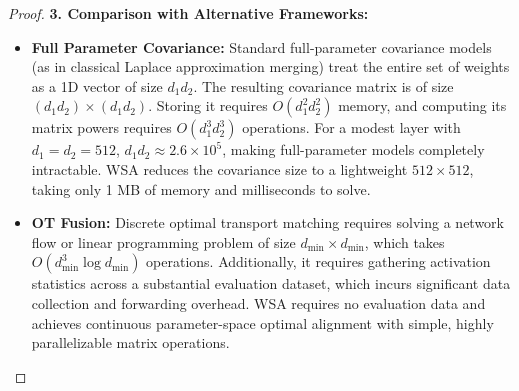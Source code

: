 \documentclass{article}
\theoremstyle{plain}
\theoremstyle{definition}
\theoremstyle{remark}
\begin{document}
\begin{proof}
\textbf{3. Comparison with Alternative Frameworks:}
\begin{itemize}
  \item \textbf{Full Parameter Covariance:} Standard full-parameter covariance models (as in classical Laplace approximation merging) treat the entire set of weights as a 1D vector of size $d_1 d_2$. The resulting covariance matrix is of size $(d_1 d_2) \times (d_1 d_2)$. Storing it requires $O(d_1^2 d_2^2)$ memory, and computing its matrix powers requires $O(d_1^3 d_2^3)$ operations. For a modest layer with $d_1 = d_2 = 512$, $d_1 d_2 \approx 2.6 \times 10^5$, making full-parameter models completely intractable. WSA reduces the covariance size to a lightweight $512 \times 512$, taking only 1 MB of memory and milliseconds to solve.
  \item \textbf{OT Fusion:} Discrete optimal transport matching requires solving a network flow or linear programming problem of size $d_{\min} \times d_{\min}$, which takes $O(d_{\min}^3 \log d_{\min})$ operations. Additionally, it requires gathering activation statistics across a substantial evaluation dataset, which incurs significant data collection and forwarding overhead. WSA requires no evaluation data and achieves continuous parameter-space optimal alignment with simple, highly parallelizable matrix operations.
\end{itemize}
\end{proof}
\end{document}
